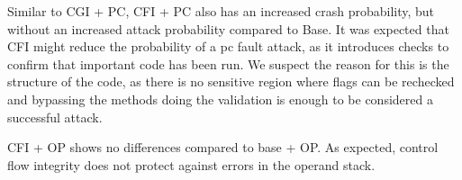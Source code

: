 Similar to CGI + PC, CFI + PC also has an increased crash probability, but without an increased attack probability compared to Base. 
It was expected that CFI might reduce the probability of a pc fault attack, as it introduces checks to confirm that important code has been run. 
We suspect the reason for this is the structure of the code, as there is no sensitive region where flags can be rechecked and bypassing the methods doing the validation is enough to be considered a successful attack.

CFI + OP shows no differences compared to base + OP. As expected, control flow integrity does not protect against errors in the operand stack. 
